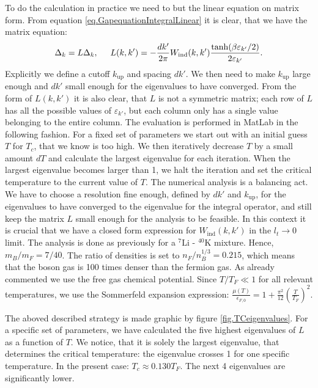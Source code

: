 To do the calculation in practice we need to but the linear equation on matrix form. From equation \eqref{eq.GapequationIntegralLinear} it is clear, that we have the matrix equation:
\begin{equation}
\Delta_k = L \Delta_k, \hspace{0.5cm} L(k,k') = -\frac{dk'}{2\pi} W_{\text{ind}}(k,k')\frac{\tanh(\beta \varepsilon_{k'}/2)}{2\varepsilon_{k'}}. 
\label{eq.Gapmatrixequation}
\end{equation}
Explicitly we define a cutoff $k_{\text{up}}$ and spacing $dk'$. We then need to make $k_{\text{up}}$ large enough and $dk'$ small enough for the eigenvalues to have converged. From the form of $L(k,k')$ it is also clear, that $L$ is not a symmetric matrix; each row of $L$ has all the possible values of $\varepsilon_{k'}$, but each column only has a single value belonging to the entire column. The evaluation is performed in MatLab in the following fashion. For a fixed set of parameters we start out with an initial guess $T$ for $T_c$, that we know is too high. We then iteratively decrease $T$ by a small amount $dT$ and calculate the largest eigenvalue for each iteration. When the largest eigenvalue becomes larger than 1, we halt the iteration and set the critical temperature to the current value of $T$. The numerical analysis is a balancing act. We have to choose a resolution fine enough, defined by $dk'$ and $k_{\text{up}}$, for the eigenvalues to have converged to the eigenvalue for the integral operator, and still keep the matrix $L$ small enough for the analysis to be feasible. In this context it is crucial that we have a closed form expression for $W_{\text{ind}}(k,k')$ in the $l_t \to 0$ limit. The analysis is done as previously for a $^{7}\text{Li}$ - $^{40}\text{K}$ mixture. Hence, $m_B/m_F = 7/40$. The ratio of densities is set to $n_F/{n_B^{1/3}} = 0.215$, which means that the boson gas is 100 times denser than the fermion gas. As already commented we use the free gas chemical potential. Since $T/T_F \ll 1$ for all relevant temperatures, we use the Sommerfeld expansion expression: $\frac{\mu(T)}{\epsilon_{F,0}} = 1 + \frac{\pi^2}{12}\left(\frac{T}{T_F}\right)^2$. 

The aboved described strategy is made graphic by figure \ref{fig.TCeigenvalues}. For a specific set of parameters, we have calculated the five highest eigenvalues of $L$ as a function of $T$. We notice, that it is solely the largest eigenvalue, that determines the critical temperature: the eigenvalue crosses 1 for one specific temperature. In the present case: $T_c \approx 0.130 T_F$. The next 4 eigenvalues are significantly lower. 

